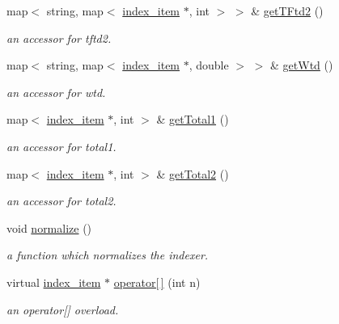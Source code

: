 \begin{DoxyCompactItemize}
map$<$ string, map$<$ \hyperlink{classindex__item}{index\+\_\+item} $\ast$, int $>$ $>$ \& \hyperlink{classindexer_ab819d6ad0ae7fb00254a5d41f4cc92cd}{get\+T\+Ftd2} ()
\begin{DoxyCompactList}\small\item\em an accessor for tftd2. \end{DoxyCompactList}\item 
map$<$ string, map$<$ \hyperlink{classindex__item}{index\+\_\+item} $\ast$, double $>$ $>$ \& \hyperlink{classindexer_a8c9a0dadc14a83bdfa36c8b7555cbc6c}{get\+Wtd} ()
\begin{DoxyCompactList}\small\item\em an accessor for wtd. \end{DoxyCompactList}\item 
map$<$ \hyperlink{classindex__item}{index\+\_\+item} $\ast$, int $>$ \& \hyperlink{classindexer_a8886ee24d98c5129a6582a95f65e31f6}{get\+Total1} ()
\begin{DoxyCompactList}\small\item\em an accessor for total1. \end{DoxyCompactList}\item 
map$<$ \hyperlink{classindex__item}{index\+\_\+item} $\ast$, int $>$ \& \hyperlink{classindexer_a8717246599f696d38d2b7051071b8957}{get\+Total2} ()
\begin{DoxyCompactList}\small\item\em an accessor for total2. \end{DoxyCompactList}\item 
void \hyperlink{classindexer_afd19e249c5224de7b4b308c5420f2412}{normalize} ()
\begin{DoxyCompactList}\small\item\em a function which normalizes the indexer. \end{DoxyCompactList}\item 
virtual \hyperlink{classindex__item}{index\+\_\+item} $\ast$ \hyperlink{classindexer_ae71041fc84d94155473de60e4407d5cc}{operator\mbox{[}$\,$\mbox{]}} (int n)
\begin{DoxyCompactList}\small\item\em an operator\mbox{[}\mbox{]} overload. \end{DoxyCompactList}\end{DoxyCompactItemize}
